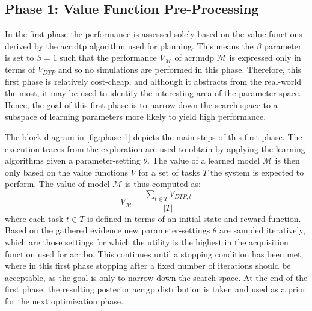 \subsection{Phase 1: Value Function Pre-Processing}
\label{sec:phase-1}

In the first phase the performance is assessed solely based on the value functions derived by the \acrshort{acr:dtp} algorithm used for planning.
This means the $\beta$ parameter is set to $\beta = 1$ such that the performance $V_{\mathcal{M}}$ of \acrshort{acr:mdp} $\mathcal{M}$ is expressed only in terms of $V_\mathit{DTP}$ and so no simulations are performed in this phase.
Therefore, this first phase is relatively cost-cheap, and although it abstracts from the real-world the most, it may be used to identify the interesting area of the parameter space.
Hence, the goal of this first phase is to narrow down the search space to a subspace of learning parameters more likely to yield high performance.

The block diagram in \autoref{fig:phase-1} depicts the main steps of this first phase. The execution traces from the exploration are used to obtain  by applying the learning algorithms given a parameter-setting $\theta$.
The value of a learned model $\mathcal{M}$ is then only based on the value functions $V$ for a set of tasks $T$ the system is expected to perform.
The value of model $\mathcal{M}$ is thus computed as:
\begin{equation} 
V_{\mathcal{M}} = \frac{\sum_{t \in T} V_{\mathit{DTP}, t}}{|T|}
\end{equation}
where each task $t \in T$ is defined in terms of an initial state and reward function.
Based on the gathered evidence new parameter-settings $\theta$ are sampled iteratively, which are those settings for which the utility is the highest in the acquisition function used for \acrshort{acr:bo}.
This continues until a stopping condition has been met, where in this first phase stopping after a fixed number of iterations should be acceptable, as the goal is only to narrow down the search space.
At the end of the first phase, the resulting posterior \acrshort{acr:gp} distribution is taken and used as a prior for the next optimization phase.



